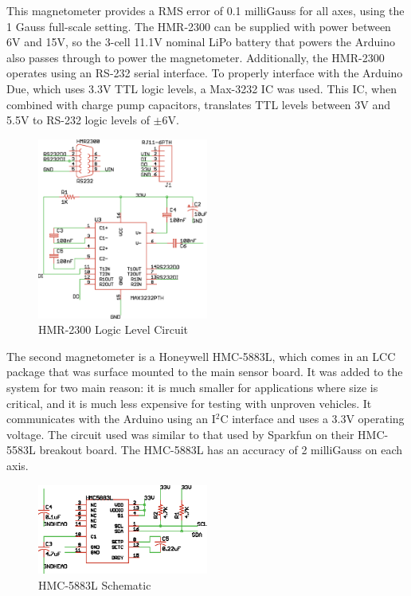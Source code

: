 This magnetometer provides a RMS error of 0.1 milliGauss for all axes, using the 1 Gauss full-scale setting\cite{hmr2300DataSheet}.
The HMR-2300 can be supplied with power between 6V and 15V, so the 3-cell 11.1V nominal LiPo battery that powers the Arduino also passes through to power the magnetometer. Additionally, the HMR-2300 operates using an RS-232 serial interface. To properly interface with the Arduino Due, which uses 3.3V TTL logic levels, a Max-3232 IC was used. This IC, when combined with charge pump capacitors, translates TTL levels between 3V and 5.5V to RS-232 logic levels of $\pm6$V.
 \begin{figure}[H]

   \centering
     \includegraphics[width=0.5\textwidth]{figures/magBoard.eps}
        \caption{HMR-2300 Logic Level Circuit} \label{magBoardSchematic}
 \end{figure}
 
 The second magnetometer is a Honeywell HMC-5883L, which comes in an LCC package that was surface mounted to the main sensor board. It was added to the system for two main reason: it is much smaller for applications where size is critical, and it is much less expensive for testing with unproven vehicles. It communicates with the Arduino using an I$^2$C interface and uses a 3.3V operating voltage\cite{hmc5883LDatasheet}. The circuit used was similar to that used by Sparkfun on their HMC-5583L breakout board\cite{hmc5883LSchematic}. The HMC-5883L has an accuracy of 2 milliGauss on each axis. 
 
 \begin{figure}[H]

   \centering
     \includegraphics[width=0.5\textwidth]{figures/hmc5883LSchematic.eps}
        \caption{HMC-5883L Schematic} \label{hmc5883LSchematic}
 \end{figure}

